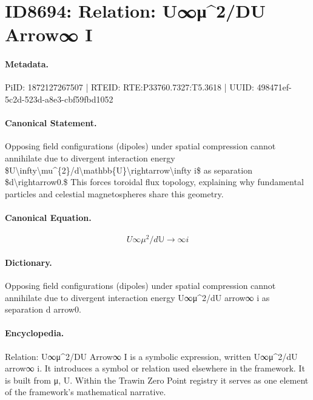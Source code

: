 \section*{ID8694: Relation: U∞μ\textasciicircum{}2/DU Arrow∞ I}
\paragraph{Metadata.}
PiID: 1872127267507 | RTEID: RTE:P33760.7327:T5.3618 | UUID: 498471ef-5c2d-523d-a8e3-cbf59fbd1052

\paragraph{Canonical Statement.}
Opposing field configurations (dipoles) under spatial compression cannot annihilate due to divergent interaction energy \$U\textbackslash{}infty\textbackslash{}mu\textasciicircum{}\{2\}/d\textbackslash{}mathbb\{U\}\textbackslash{}rightarrow\textbackslash{}infty i\$ as separation \$d\textbackslash{}rightarrow0.\$ This forces toroidal flux topology, explaining why fundamental particles and celestial magnetospheres share this geometry.

\paragraph{Canonical Equation.}
\[
U\infty\mu^{2}/d\mathbb{U}\rightarrow\infty i
\]

\paragraph{Dictionary.}
Opposing field configurations (dipoles) under spatial compression cannot annihilate due to divergent interaction energy U∞μ\textasciicircum{}2/dU arrow∞ i as separation d arrow0.

\paragraph{Encyclopedia.}
Relation: U∞μ\textasciicircum{}2/DU Arrow∞ I is a symbolic expression, written U∞μ\textasciicircum{}2/dU arrow∞ i. It introduces a symbol or relation used elsewhere in the framework. It is built from μ, U. Within the Trawin Zero Point registry it serves as one element of the framework's mathematical narrative.
